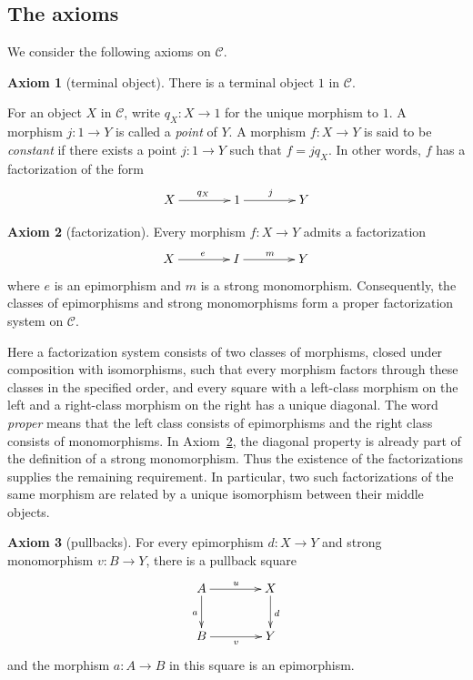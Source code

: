 \documentclass[11pt,a4paper]{article}
\theoremstyle{plain}
\theoremstyle{definition}
\newtheorem{axiom}{Axiom}
\theoremstyle{remark}
\newcommand{\C}{\mathcal C}
\newcommand{\one}{1}
\begin{document}
\subsection{The axioms}\label{sec:axiom-list}

We consider the following axioms on $\C$.

\begin{axiom}[terminal object]\label{ax:N}
There is a terminal object $\one$ in $\C$.
\end{axiom}

For an object $X$ in $\C$, write $q_X:X\to\one$ for the unique
morphism to $\one$. A morphism $j:\one\to Y$ is called a
\emph{point} of $Y$. A morphism $f:X\to Y$ is said to be
\emph{constant} if there exists a point $j:\one\to Y$ such that
$f=jq_X$. In other words, $f$ has a factorization of the form
\[
\xymatrix@C=4em{
X\ar[r]^{q_X}&\one\ar[r]^j&Y
}
\]

\begin{axiom}[factorization]\label{ax:F}
Every morphism $f:X\to Y$ admits a factorization
\[
\xymatrix@C=4em{
X\ar[r]^e& I\ar[r]^m&Y
}
\]
where $e$ is an epimorphism and $m$ is a strong monomorphism.
Consequently, the classes of epimorphisms and strong monomorphisms
form a proper factorization system on $\C$.
\end{axiom}

Here a factorization system consists of two classes of morphisms,
closed under composition with isomorphisms, such that every
morphism factors through these classes in the
specified order, and every square with a left-class morphism on
the left and a right-class morphism on the right has a unique
diagonal. The word \emph{proper} means that the left class consists
of epimorphisms and the right class consists of monomorphisms.
In Axiom~\ref{ax:F}, the diagonal property is already part of
the definition of a strong monomorphism. Thus the existence of
the factorizations supplies the remaining requirement. In
particular, two such factorizations of the same morphism are
related by a unique isomorphism between their middle objects.

\begin{axiom}[pullbacks]\label{ax:Dpull}
For every epimorphism $d:X\to Y$ and strong monomorphism
$v:B\to Y$, there is a pullback square
\[
\xymatrix@C=4em@R=2.5em{
A\ar[r]^u\ar[d]_a&X\ar[d]^d\\
B\ar[r]_v&Y
}
\]
and the morphism $a:A\to B$ in this square is an epimorphism.
\end{axiom}
\end{document}
